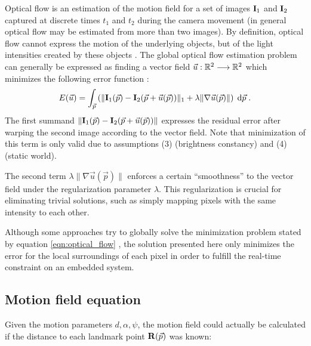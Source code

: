Optical flow is an estimation of the motion field for a set of images $\mathbf{I}_1$ and $\mathbf{I}_2$ captured at discrete times $t_1$ and $t_2$ during the camera movement (in general optical flow may be estimated from more than two images). By definition, optical flow cannot express the motion of the underlying objects, but of the light intensities created by these objects \citep[][chapter 4.2.7 ``Motion and optical flow'', p. 189]{AutonomousMobileRobots}. The global optical flow estimation problem can generally be expressed as finding a vector field $\vec u : \R^2 \longrightarrow \R^2$ which minimizes the following error function \citep[adapted from][]{hornSchunck}:
\begin{equation}
  E(\vec u) = \int_{\vec p} \left( \|\img{I}_1(\vec p) - \img{I}_2(\vec p + \vec u(\vec p))\|_1 + \lambda \| \nabla \vec u(\vec p) \| \right) \; \mathrm{d}\vec p \label{eqn:optical_flow} \; .
\end{equation}
The first summand $\|\img{I}_1(\vec p) - \img{I}_2(\vec p + \vec u(\vec p))\|$ expresses the residual error after warping the second image according to the vector field. Note that minimization of this term is only valid due to assumptions (3) (brightness constancy) and (4) (static world).

The second term $\lambda \| \nabla \vec u(\vec p) \|$  enforces a certain ``smoothness'' to the vector field under the regularization parameter $\lambda$. This regularization is crucial for eliminating trivial solutions, such as simply mapping pixels with the same intensity to each other.

Although some approaches try to globally solve the minimization problem stated by equation \ref{eqn:optical_flow} \citep[e.g.][chapter 5 ``Real-time Optical Flow'']{totalVariation}, the solution presented here only minimizes the error for the local surroundings of each pixel in order to fulfill the real-time constraint on an embedded system.

\subsection{Motion field equation}

Given the motion parameters $d, \alpha, \psi$, the motion field could actually be calculated if the distance to each landmark point $\img{R}(\vec p)$ was known:

